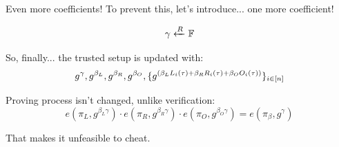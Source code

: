 \documentclass{zkdl-presentation-template}
\begin{document}
    \begin{frame}{Even more coefficients!}
        To prevent this, let's introduce... one more coefficient!
        \vspace{-5pt}

        \begin{equation*}
            \gamma \xleftarrow{R} \mathbb{F}
            \vspace{-5pt}
        \end{equation*}

        
        So, finally... the trusted setup is updated with:
        \vspace{-5pt}
        \begin{equation*}
            g^{\gamma}, g^{\beta_L}, g^{\beta_R}, g^{\beta_O}, \{g^{\left( \beta_LL_i(\tau) + \beta_RR_i(\tau) + \beta_OO_i(\tau) \right)}\}_{i \in \left[ n \right]}
            \vspace{-5pt}
        \end{equation*}

        
        Proving process isn't changed, unlike verification:
        \begin{equation*}
            e(\pi_L, g^{\beta_L\gamma}) \cdot e(\pi_R, g^{\beta_R\gamma}) \cdot e(\pi_O, g^{\beta_O\gamma}) = e(\pi_{\beta}, g^{\gamma})
        \end{equation*}

        That makes it unfeasible to cheat.
    \end{frame}
\end{document}
